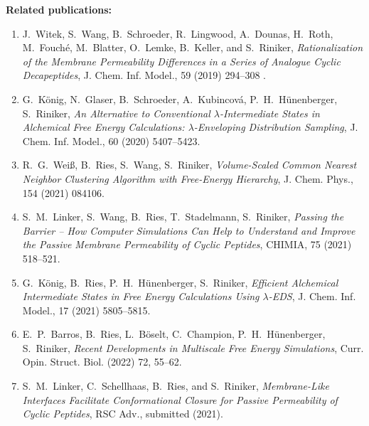 \newpage
\noindent \textbf{Related publications:}
\begin{enumerate}
    \item J.\ Witek, S.\ Wang, B.\ Schroeder, R.\ Lingwood, A.\ Dounas, H.\ Roth, M.\ Fouché, M.\ Blatter, O.\ Lemke, B.\ Keller, and S.\ Riniker, \textit{Rationalization of the Membrane Permeability Differences in a Series of Analogue Cyclic Decapeptides}, {J. Chem. Inf. Model.}, {59} (2019) 294--308 .
    \item  G.\ K\"onig, N.\ Glaser, B.\ Schroeder, A.\ Kubincová, P.\ H.\ H\"unenberger, S.\ Riniker, \textit{An Alternative to Conventional $\lambda$-Intermediate States in Alchemical Free Energy Calculations: $\lambda$-Enveloping Distribution Sampling}, {J. Chem. Inf. Model.}, {60} (2020) 5407--5423.
    \item R.\ G.\ Wei\ss, B.\ Ries, S.\ Wang, S.\ Riniker, \textit{Volume-Scaled Common Nearest Neighbor Clustering Algorithm with Free-Energy Hierarchy}, {J. Chem. Phys.}, {154} (2021) 084106.
    \item S.\ M.\ Linker, S.\ Wang, B.\ Ries, T.\ Stadelmann, S.\ Riniker, \textit{Passing the Barrier – How Computer Simulations Can Help to Understand and Improve the Passive Membrane Permeability of Cyclic Peptides}, {CHIMIA}, {75} (2021) 518--521.
    \item G.\ K\"onig, B.\ Ries, P.\ H.\ H\"unenberger, S.\ Riniker, \textit{Efficient Alchemical Intermediate States in Free Energy Calculations Using  $\lambda$-EDS}, {J. Chem. Inf. Model.}, {17} (2021) 5805--5815.
    \item E.\ P.\ Barros, B.\ Ries, L.\ B\"oselt, C.\ Champion, P.\ H.\ H\"unenberger, S.\ Riniker, \textit{Recent Developments in Multiscale Free Energy Simulations}, {Curr. Opin. Struct. Biol.} (2022) {72}, 55--62.
    \item S.\ M.\ Linker, C.\ Schellhaas, B.\ Ries, and S.\ Riniker,\textit{ Membrane-Like Interfaces Facilitate Conformational Closure for Passive Permeability of Cyclic Peptides}, {RSC Adv.}, submitted (2021).

\end{enumerate}
